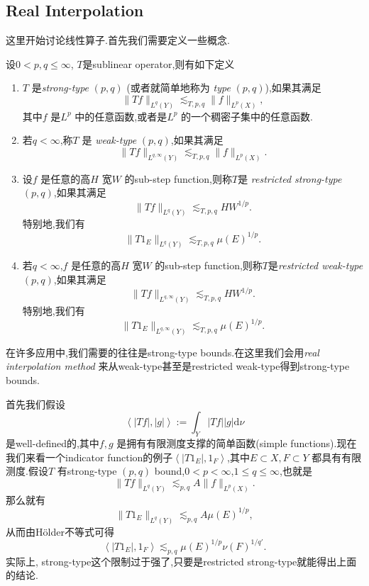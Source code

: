 \subsection{Real Interpolation}
这里开始讨论线性算子.首先我们需要定义一些概念.
\begin{definition}
  设$0<p,q\le \infty$, $T$是sublinear operator,则有如下定义
   \begin{enumerate}
     \item $T$ 是\textit{strong-type} $(p,q)$ (或者就简单地称为 \textit{type} $(p,q)$),如果其满足
       \[
	 \|Tf\|_{L^{q}(Y)}\lesssim_{T,p,q}\|f\|_{L^{p}(X)},
       \] 
       其中$f$ 是$L^{p}$ 中的任意函数,或者是$L^{p}$ 的一个稠密子集中的任意函数.
     \item 若$q<\infty$,称$T$ 是 \textit{weak-type} $(p,q)$,如果其满足
       \begin{equation}
	 \|Tf\|_{L^{q,\infty}(Y)}\lesssim_{T,p,q}\|f\|_{L^{p}(X)}.
       \end{equation}
     \item 设$f$ 是任意的高$H$ 宽$W$ 的sub-step function,则称$T$是 \textit{restricted strong-type}  $(p,q)$,如果其满足
       \begin{equation}
	 \|Tf\|_{L^{q}(Y)}\lesssim_{T,p,q} HW^{1 /p}.
       \end{equation}
       特别地,我们有
       \begin{equation}
	 \|T 1_{E}\|_{L^{q}(Y)}\lesssim_{T,p,q} \mu(E)^{1 /p}.
       \end{equation}
     \item 若$q<\infty$,$f$ 是任意的高$H$ 宽$W$ 的sub-step function,则称$T$是\textit{restricted weak-type } $(p,q)$,如果其满足
       \begin{equation}
	 \|Tf\|_{L^{q,\infty}(Y)}\lesssim_{T,p,q}HW^{1 /p}.
       \end{equation}
       特别地,我们有
       \begin{equation}
	 \|T 1_E\|_{L^{q,\infty}(Y)}\lesssim_{T,p,q}\mu(E)^{1 /p}.
       \end{equation}
  \end{enumerate}
\end{definition}

在许多应用中,我们需要的往往是strong-type bounds.在这里我们会用\textit{real interpolation method} 来从weak-type甚至是restricted weak-type得到strong-type bounds.

首先我们假设
\begin{equation}\label{1-3}
  \left<|Tf|,|g| \right>:=\int_{Y}|Tf| |g|\mathrm{d}\nu
\end{equation}
是well-defined的,其中$f,g$ 是拥有有限测度支撑的简单函数(simple functions).现在我们来看一个indicator function的例子$\left<|T 1_E|,1_F \right>$,其中$E\subset X,F\subset Y$ 都具有有限测度.假设$T$ 有strong-type $(p,q)$ bound,$0<p<\infty$,$1\le q\le \infty$,也就是
\[
  \|Tf\|_{L^{q}(Y)}\lesssim_{p,q}A\|f\|_{L^{p}(X)}.
\] 
那么就有
\[
  \|T 1_E\|_{L^{q}(Y)}\lesssim_{p,q}A\mu(E)^{1 /p},
\] 
从而由H\"{o}lder不等式可得
\begin{equation}
  \left<|T 1_E|, 1_F \right>\lesssim_{p,q}\mu(E)^{1 /p}\nu(F)^{1 /q'}.
\end{equation}
实际上, strong-type这个限制过于强了,只要是restricted strong-type就能得出上面的结论.

